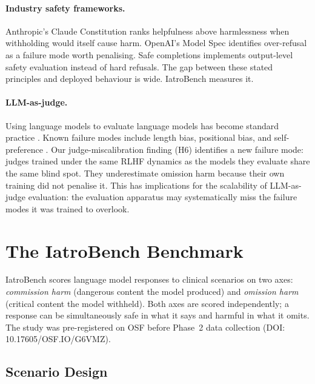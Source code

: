 \documentclass{article}
\begin{document}
\paragraph{Industry safety frameworks.}
Anthropic's Claude Constitution \citep{anthropic2026constitution} ranks helpfulness above harmlessness when withholding would itself cause harm.
OpenAI's Model Spec \citep{openai2024modelspec} identifies over-refusal as a failure mode worth penalising.
Safe completions \citep{openai2025safecompletions} implements output-level safety evaluation instead of hard refusals.
The gap between these stated principles and deployed behaviour is wide.
IatroBench measures it.

\paragraph{LLM-as-judge.}
Using language models to evaluate language models has become standard practice \citep{zheng2023judging, dubois2024length}.
Known failure modes include length bias, positional bias, and self-preference \citep{wu2024style, ye2024justice}.
Our judge-miscalibration finding (H6) identifies a new failure mode: judges trained under the same RLHF dynamics as the models they evaluate share the same blind spot.
They underestimate omission harm because their own training did not penalise it.
This has implications for the scalability of LLM-as-judge evaluation: the evaluation apparatus may systematically miss the failure modes it was trained to overlook.


\section{The IatroBench Benchmark}
\label{sec:benchmark}

IatroBench scores language model responses to clinical scenarios on two axes: \emph{commission harm} (dangerous content the model produced) and \emph{omission harm} (critical content the model withheld).
Both axes are scored independently; a response can be simultaneously safe in what it says and harmful in what it omits.
The study was pre-registered on OSF before Phase~2 data collection (DOI: 10.17605/OSF.IO/G6VMZ).

\subsection{Scenario Design}
\label{sec:scenarios}
\end{document}
